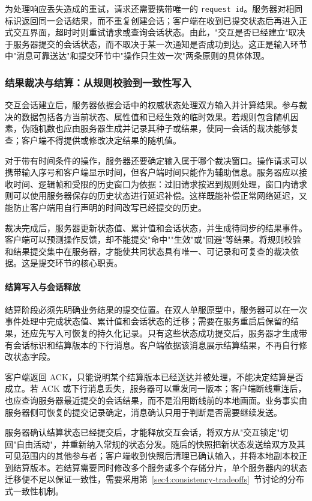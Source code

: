 为处理响应丢失造成的重试，请求还需要携带唯一的 \texttt{request id}。服务器对相同标识返回同一会话结果，而不重复创建会话；客户端在收到已提交状态后再进入正式交互界面，超时时则重试请求或查询会话状态。由此，"交互是否已经建立"取决于服务器提交的会话状态，而不取决于某一次通知是否成功到达。这正是输入环节中"消息可靠送达"和提交环节中"操作只生效一次"两条原则的具体体现。

\subsubsection{结果裁决与结算：从规则校验到一致性写入}\label{sec2:battle-arbitration}

交互会话建立后，服务器依据会话中的权威状态处理双方输入并计算结果。参与裁决的数据包括各方当前状态、属性值和已经生效的临时效果。若规则包含随机因素，伪随机数也应由服务器生成并记录其种子或结果，使同一会话的裁决能够复查；客户端不得提供或修改决定结果的随机值。

对于带有时间条件的操作，服务器还要确定输入属于哪个裁决窗口。操作请求可以携带输入序号和客户端显示时间，但客户端时间只能作为辅助信息。服务器应以接收时间、逻辑帧和受限的历史窗口为依据：过旧请求按迟到规则处理，窗口内请求则可以使用服务器保存的历史状态进行延迟补偿。这样既能补偿正常网络延迟，又能防止客户端用自行声明的时间改写已经提交的历史。

裁决完成后，服务器更新状态值、累计值和会话状态，并生成待同步的结果事件。客户端可以预测操作反馈，却不能提交"命中""生效"或"回避"等结果。将规则校验和结果提交集中在服务器，才能使共同状态具有唯一、可记录和可复查的裁决依据。这是提交环节的核心职责。

\paragraph{结算写入与会话释放}\label{sec2:battle-commit}

结算阶段必须先明确业务结果的提交位置。在双人单服原型中，服务器可以在一次事件处理中完成状态值、累计值和会话状态的迁移；需要在服务重启后保留的结果，还应先写入可恢复的持久化记录。只有这些状态成功提交后，服务器才生成带有会话标识和结算版本的下行消息。客户端依据该消息展示结算结果，不再自行修改状态字段。

客户端返回 ACK，只能说明某个结算版本已经送达并被处理，不能决定结算是否成立。若 ACK 或下行消息丢失，服务器可以重发同一版本；客户端断线重连后，也应查询服务器最近提交的会话结果，而不是沿用断线前的本地画面。业务事实由服务器侧可恢复的提交记录确定，消息确认只用于判断是否需要继续发送。

服务器确认结算状态已经提交后，才能释放交互会话，将双方从"交互锁定"切回"自由活动"，并重新纳入常规的状态分发。随后的快照把新状态发送给双方及其可见范围内的其他参与者；客户端收到快照后清理已确认输入，并将本地副本校正到结算版本。若结算需要同时修改多个服务或多个存储分片，单个服务器内的状态迁移便不足以保证一致性，需要采用第~\ref{sec4:consistency-tradeoffs}~节讨论的分布式一致性机制。

